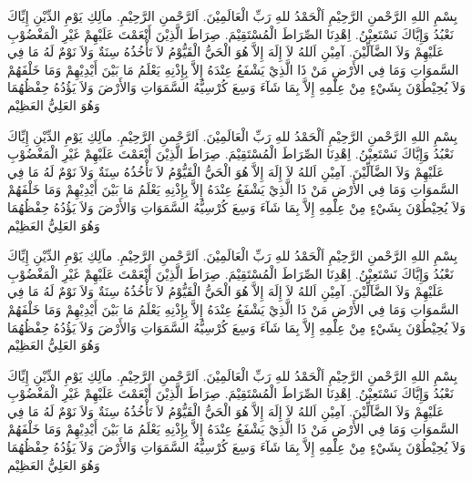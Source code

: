 \documentclass{article}
\begin{document}
  بِسْمِ اللهِ الرَّحْمنِ الرَّحِيْمِ اَلْحَمْدُ للهِ رَبِّ الْعَالَمِيْنَ. اَلرَّحْمنِ الرَّحِيْمِ. ماَلِكِ يَوْمِ الدِّيْنِ إِيِّاكَ نَعْبُدُ وَإِيَّاكَ نَسْتَعِيْنُ. اِهْدِنَا الصِّرَاطَ الْمُسْتَقِيْمَ. صِرَاطَ الَّذِيْنَ أَنْعَمْتَ عَلَيْهِمْ غَيْرِ الْمَغْضُوْبِ عَلَيْهِمْ وَلاَ الضَّآلِّيْنَ. آمِيْنِ
  اَللهُ لاَ إِلَهَ إِلاَّ هُوَ الْحَيُّ الْقَيُّوْمُ لاَ تَأْخُذُهُ سِنَةٌ وَلاَ نَوْمٌ لَهُ مَا فِي السَّموَاتِ وَمَا فِي الأَرْضِ مَنْ ذَا الَّذِيْ يَشْفَعُ عِنْدَهُ إِلاَّ بِإِذْنِهِ يَعْلَمُ مَا بَيْنَ أَيْدِيْهِمْ وَمَا خَلْفَهُمْ وَلاَ يُحِيْطُوْنَ بِشَيْءٍ مِنْ عِلْمِهِ إِلاَّ بِمَا شَآءَ وَسِعَ كُرْسِيُّهُ السَّمَوَاتِ وَالأَرْضَ  وَلاَ يَؤُدُهُ حِفْظُهُمَا وَهُوَ العَلِيُّ العَظِيْم

  بِسْمِ اللهِ الرَّحْمنِ الرَّحِيْمِ اَلْحَمْدُ للهِ رَبِّ الْعَالَمِيْنَ. اَلرَّحْمنِ الرَّحِيْمِ. ماَلِكِ يَوْمِ الدِّيْنِ إِيِّاكَ نَعْبُدُ وَإِيَّاكَ نَسْتَعِيْنُ. اِهْدِنَا الصِّرَاطَ الْمُسْتَقِيْمَ. صِرَاطَ الَّذِيْنَ أَنْعَمْتَ عَلَيْهِمْ غَيْرِ الْمَغْضُوْبِ عَلَيْهِمْ وَلاَ الضَّآلِّيْنَ. آمِيْنِ
  اَللهُ لاَ إِلَهَ إِلاَّ هُوَ الْحَيُّ الْقَيُّوْمُ لاَ تَأْخُذُهُ سِنَةٌ وَلاَ نَوْمٌ لَهُ مَا فِي السَّموَاتِ وَمَا فِي الأَرْضِ مَنْ ذَا الَّذِيْ يَشْفَعُ عِنْدَهُ إِلاَّ بِإِذْنِهِ يَعْلَمُ مَا بَيْنَ أَيْدِيْهِمْ وَمَا خَلْفَهُمْ وَلاَ يُحِيْطُوْنَ بِشَيْءٍ مِنْ عِلْمِهِ إِلاَّ بِمَا شَآءَ وَسِعَ كُرْسِيُّهُ السَّمَوَاتِ وَالأَرْضَ  وَلاَ يَؤُدُهُ حِفْظُهُمَا وَهُوَ العَلِيُّ العَظِيْم

  بِسْمِ اللهِ الرَّحْمنِ الرَّحِيْمِ اَلْحَمْدُ للهِ رَبِّ الْعَالَمِيْنَ. اَلرَّحْمنِ الرَّحِيْمِ. ماَلِكِ يَوْمِ الدِّيْنِ إِيِّاكَ نَعْبُدُ وَإِيَّاكَ نَسْتَعِيْنُ. اِهْدِنَا الصِّرَاطَ الْمُسْتَقِيْمَ. صِرَاطَ الَّذِيْنَ أَنْعَمْتَ عَلَيْهِمْ غَيْرِ الْمَغْضُوْبِ عَلَيْهِمْ وَلاَ الضَّآلِّيْنَ. آمِيْنِ
  اَللهُ لاَ إِلَهَ إِلاَّ هُوَ الْحَيُّ الْقَيُّوْمُ لاَ تَأْخُذُهُ سِنَةٌ وَلاَ نَوْمٌ لَهُ مَا فِي السَّموَاتِ وَمَا فِي الأَرْضِ مَنْ ذَا الَّذِيْ يَشْفَعُ عِنْدَهُ إِلاَّ بِإِذْنِهِ يَعْلَمُ مَا بَيْنَ أَيْدِيْهِمْ وَمَا خَلْفَهُمْ وَلاَ يُحِيْطُوْنَ بِشَيْءٍ مِنْ عِلْمِهِ إِلاَّ بِمَا شَآءَ وَسِعَ كُرْسِيُّهُ السَّمَوَاتِ وَالأَرْضَ  وَلاَ يَؤُدُهُ حِفْظُهُمَا وَهُوَ العَلِيُّ العَظِيْم

  بِسْمِ اللهِ الرَّحْمنِ الرَّحِيْمِ اَلْحَمْدُ للهِ رَبِّ الْعَالَمِيْنَ. اَلرَّحْمنِ الرَّحِيْمِ. ماَلِكِ يَوْمِ الدِّيْنِ إِيِّاكَ نَعْبُدُ وَإِيَّاكَ نَسْتَعِيْنُ. اِهْدِنَا الصِّرَاطَ الْمُسْتَقِيْمَ. صِرَاطَ الَّذِيْنَ أَنْعَمْتَ عَلَيْهِمْ غَيْرِ الْمَغْضُوْبِ عَلَيْهِمْ وَلاَ الضَّآلِّيْنَ. آمِيْنِ
  اَللهُ لاَ إِلَهَ إِلاَّ هُوَ الْحَيُّ الْقَيُّوْمُ لاَ تَأْخُذُهُ سِنَةٌ وَلاَ نَوْمٌ لَهُ مَا فِي السَّموَاتِ وَمَا فِي الأَرْضِ مَنْ ذَا الَّذِيْ يَشْفَعُ عِنْدَهُ إِلاَّ بِإِذْنِهِ يَعْلَمُ مَا بَيْنَ أَيْدِيْهِمْ وَمَا خَلْفَهُمْ وَلاَ يُحِيْطُوْنَ بِشَيْءٍ مِنْ عِلْمِهِ إِلاَّ بِمَا شَآءَ وَسِعَ كُرْسِيُّهُ السَّمَوَاتِ وَالأَرْضَ  وَلاَ يَؤُدُهُ حِفْظُهُمَا وَهُوَ العَلِيُّ العَظِيْم
\end{document}
